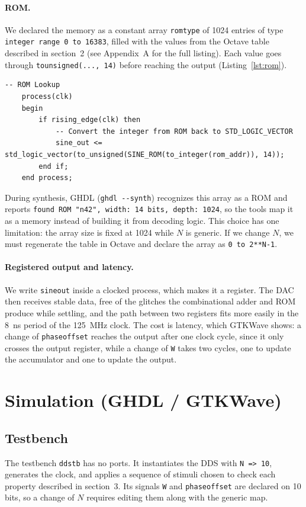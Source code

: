 \documentclass[11pt,a4paper]{article}
\renewcommand{\_}{\oldunderscore\allowbreak}
\begin{document}
\paragraph{ROM.} We declared the memory as a constant array \texttt{rom\_type} of
1024 entries of type \texttt{integer range 0 to 16383}, filled with the values
from the Octave table described in section~2 (see Appendix~A for the full
listing). Each value goes through \texttt{to\_unsigned(..., 14)} before reaching
the output (Listing~\ref{lst:rom}).
\begin{lstlisting}[style=vhdl, caption={ROM lookup}, label={lst:rom}]
-- ROM Lookup
    process(clk)
    begin
        if rising_edge(clk) then
            -- Convert the integer from ROM back to STD_LOGIC_VECTOR
            sine_out <= std_logic_vector(to_unsigned(SINE_ROM(to_integer(rom_addr)), 14));
        end if;
    end process;
\end{lstlisting}
During synthesis, GHDL (\texttt{ghdl -{}-synth}) recognizes this array as a ROM and
reports \texttt{found ROM "n42", width: 14 bits, depth: 1024}, so the tools map it as
a memory instead of building it from decoding logic. This choice has one limitation:
the array size is fixed at 1024 while $N$ is generic. If we change $N$, we must
regenerate the table in Octave and declare the array as \texttt{0 to 2**N-1}.

\paragraph{Registered output and latency.} We write \texttt{sine\_out} inside a
clocked process, which makes it a register. The DAC then receives stable data,
free of the glitches the combinational adder and ROM produce while settling, and
the path between two registers fits more easily in the \SI{8}{\nano\second}
period of the \SI{125}{\mega\hertz} clock. The cost is latency, which GTKWave
shows: a change of \texttt{phase\_offset} reaches the output after one clock
cycle, since it only crosses the output register, while a change of \texttt{W}
takes two cycles, one to update the accumulator and one to update the output.

\section{Simulation (GHDL / GTKWave)}

\subsection{Testbench}
The testbench \texttt{dds\_tb} has no ports. It instantiates the DDS with
\texttt{N => 10}, generates the clock, and applies a sequence of stimuli chosen to
check each property described in section~3. Its signals \texttt{W} and
\texttt{phase\_offset} are declared on 10 bits, so a change of $N$ requires editing
them along with the generic map.
\end{document}
